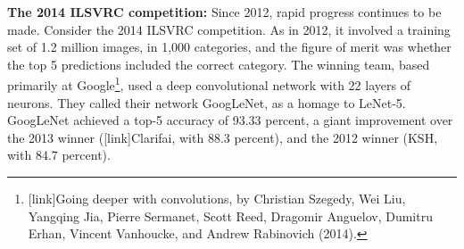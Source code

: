 \documentclass[a4paper,twoside,10pt]{book}
\begin{document}
\textbf{The 2014 ILSVRC competition:} Since 2012, rapid progress continues to be made. Consider the 2014 ILSVRC competition. As in 2012, it involved a training set of 1.2 million images, in 1,000 categories, and the figure of merit was whether the top 5 predictions included the correct category. The winning team, based primarily at Google\footnote{[link]Going deeper with convolutions, by Christian Szegedy, Wei Liu, Yangqing Jia, Pierre Sermanet, Scott Reed, Dragomir Anguelov, Dumitru Erhan, Vincent Vanhoucke, and Andrew Rabinovich (2014).}, used a deep convolutional network with 22 layers of neurons. They called their network GoogLeNet, as a homage to LeNet-5. GoogLeNet achieved a top-5 accuracy of 93.33 percent, a giant improvement over the 2013 winner ([link]Clarifai, with 88.3 percent), and the 2012 winner (KSH, with 84.7 percent).
\end{document}
